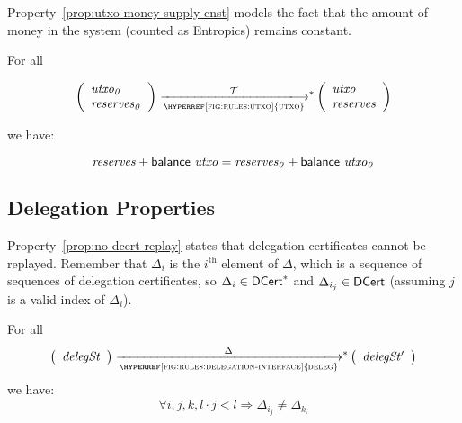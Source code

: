 Property~\ref{prop:utxo-money-supply-cnst} models the fact that the amount of
money in the system (counted as Entropics) remains constant.

\begin{property}\label{prop:utxo-money-supply-cnst}
  For all

  $$
  \left(
    \begin{array}{l}
      \var{utxo_0}\\
      \var{reserves_0}
    \end{array}
  \right)
  \transtar{\hyperref[fig:rules:utxo]{utxo}}{\txs}
  \left(
    \begin{array}{l}
      \var{utxo}\\
      \var{reserves}
    \end{array}
  \right)
  $$

  we have:

  $$ \mathit{reserves} + \mathsf{balance}~ \mathit{utxo} =  \mathit{reserves_0} + \mathsf{balance}~ \mathit{utxo_0} $$
\end{property}

\subsection{Delegation Properties}
\label{sec:delegation-props}

Property~\ref{prop:no-dcert-replay} states that delegation certificates cannot be replayed. Remember
that $\Delta_i$ is the $i^{\text{th}}$ element of $\Delta$, which is a sequence of sequences of
delegation certificates, so $\Delta_i \in \mathsf{DCert}^{*}$ and $\Delta_{i_j} \in \mathsf{DCert}$ (assuming
$j$ is a valid index of $\Delta_i$).

\begin{property}\label{prop:no-dcert-replay}
  For all
  $$
  \left(
    \begin{array}{l}
      \var{delegSt}
    \end{array}
  \right)
  \transtar{\hyperref[fig:rules:delegation-interface]{deleg}}{\Delta}
  \left(
    \begin{array}{l}
      \var{delegSt'}
    \end{array}
  \right)
  $$
  we have:
  $$
  \forall i, j, k, l \cdot j < l \Rightarrow \Delta_{i_j} \neq \Delta_{k_l}
  $$
\end{property}
